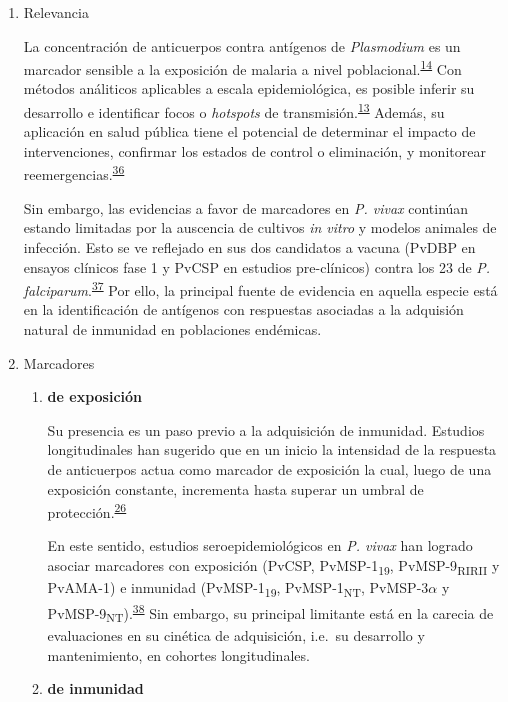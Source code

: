 \documentclass[]{article}
\begin{document}
\begin{enumerate}
\def\labelenumi{\alph{enumi}.}
\item
  Relevancia

  La concentración de anticuerpos contra antígenos de \emph{Plasmodium}
  es un marcador sensible a la exposición de malaria a nivel
  poblacional.\textsuperscript{\protect\hyperlink{ref-elliott2014}{14}}
  Con métodos análiticos aplicables a escala epidemiológica, es posible
  inferir su desarrollo e identificar focos o \emph{hotspots} de
  transmisión.\textsuperscript{\protect\hyperlink{ref-hotspots2015}{13}}
  Además, su aplicación en salud pública tiene el potencial de
  determinar el impacto de intervenciones, confirmar los estados de
  control o eliminación, y monitorear
  reemergencias.\textsuperscript{\protect\hyperlink{ref-sepulveda2015}{36}}

  Sin embargo, las evidencias a favor de marcadores en \emph{P. vivax}
  continúan estando limitadas por la auscencia de cultivos \emph{in
  vitro} y modelos animales de infección. Esto se ve reflejado en sus
  dos candidatos a vacuna (PvDBP en ensayos clínicos fase 1 y PvCSP en
  estudios pre-clínicos) contra los 23 de \emph{P.
  falciparum}.\textsuperscript{\protect\hyperlink{ref-rainbow2016}{37}}
  Por ello, la principal fuente de evidencia en aquella especie está en
  la identificación de antígenos con respuestas asociadas a la adquisión
  natural de inmunidad en poblaciones endémicas.
\item
  Marcadores

  \begin{enumerate}
  \def\labelenumii{\roman{enumii}.}
  \item
    \textbf{de exposición}

    Su presencia es un paso previo a la adquisición de inmunidad.
    Estudios longitudinales han sugerido que en un inicio la intensidad
    de la respuesta de anticuerpos actua como marcador de exposición la
    cual, luego de una exposición constante, incrementa hasta superar un
    umbral de
    protección.\textsuperscript{\protect\hyperlink{ref-Stanisic2015}{26}}

    En este sentido, estudios seroepidemiológicos en \emph{P. vivax} han
    logrado asociar marcadores con exposición (PvCSP,
    PvMSP-1\textsubscript{19}, PvMSP-9\textsubscript{RIRII} y PvAMA-1) e
    inmunidad (PvMSP-1\textsubscript{19}, PvMSP-1\textsubscript{NT},
    PvMSP-3\(\alpha\) y
    PvMSP-9\textsubscript{NT}).\textsuperscript{\protect\hyperlink{ref-cutts2014meta}{38}}
    Sin embargo, su principal limitante está en la carecia de
    evaluaciones en su cinética de adquisición, i.e.~su desarrollo y
    mantenimiento, en cohortes longitudinales. 
  \item
    \textbf{de inmunidad}


\end{enumerate}
\end{enumerate}
\end{document}

